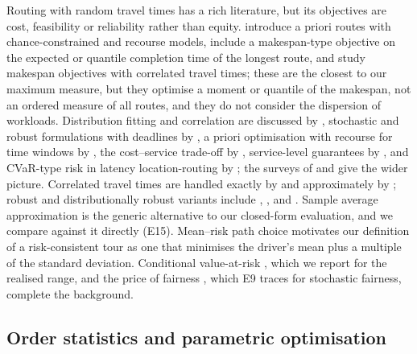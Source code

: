 \documentclass[11pt]{article}
\theoremstyle{definition}
\begin{document}
Routing with random travel times has a rich literature, but its objectives
are cost, feasibility or reliability rather than equity.
\citet{laporte1992vehicle} introduce a priori routes with chance-constrained
and recourse models, \citet{kenyon2003stochastic} include a makespan-type
objective on the expected or quantile completion time of the longest route,
and \citet{bakach2021solving} study makespan objectives with correlated
travel times; these are the closest to our maximum measure, but they
optimise a moment or quantile of the makespan, not an ordered measure of all
routes, and they do not consider the dispersion of workloads. Distribution
fitting and correlation are discussed by \citet{gomez2016modeling},
stochastic and robust formulations with deadlines by
\citet{adulyasak2016models}, a priori optimisation with recourse for time
windows by \citet{errico2016apriori,errico2018vehicle}, the cost--service
trade-off by \citet{zhang2013stochastic}, service-level guarantees by
\citet{ehmke2015ensuring}, and CVaR-type risk in latency location-routing by
\citet{osoriomora2025riskaverse}; the surveys of \citet{oyola2018part1} and
\citet{gendreau2016future} give the wider picture. Correlated travel times are
handled exactly by \citet{rostami2021branch} and approximately by
\citet{rajabibahaabadi2021reliable,bomboi2022stochastic}; robust and
distributionally robust variants include \citet{han2014robust},
\citet{jaillet2016routing}, \citet{zhang2021distribution} and
\citet{ghosal2020distributionally}. Sample average approximation
\citep{verweij2003sample} is the generic alternative to our closed-form
evaluation, and we compare against it directly (E15). Mean--risk path choice
\citep{sen2001meanvariance,nikolova2014meanrisk} motivates our definition of
a risk-consistent tour as one that minimises the driver's mean plus a
multiple of the standard deviation. Conditional value-at-risk
\citep{rockafellar2000optimization,rockafellar2002conditional}, which we report
for the realised range, and the price of fairness
\citep{bertsimas2011price,mo2000fair}, which E9 traces for stochastic
fairness, complete the background.

\subsection{Order statistics and parametric optimisation}
\end{document}
